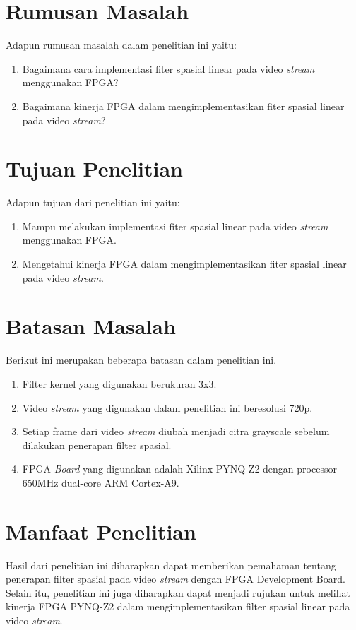 \pagebreak

\section{Rumusan Masalah}
Adapun rumusan masalah dalam penelitian ini yaitu:
\begin{enumerate}[topsep=0pt,itemsep=0pt,partopsep=0pt, parsep=0pt]
    \item Bagaimana cara implementasi fiter spasial linear pada video \textit{stream} menggunakan FPGA? 
    \item Bagaimana kinerja FPGA dalam mengimplementasikan fiter spasial linear pada video \textit{stream}? 
\end{enumerate}

\section{Tujuan Penelitian}
Adapun tujuan dari penelitian ini yaitu:
\begin{enumerate}[topsep=0pt,itemsep=0pt,partopsep=0pt, parsep=0pt]
    \item Mampu melakukan implementasi fiter spasial linear pada video \textit{stream} menggunakan FPGA.
    \item Mengetahui kinerja FPGA dalam mengimplementasikan fiter spasial linear pada video \textit{stream}.
\end{enumerate}


\section{Batasan Masalah}
Berikut ini merupakan beberapa batasan dalam penelitian ini.
\begin{enumerate}[topsep=0pt,itemsep=0pt,partopsep=0pt, parsep=0pt]
    \item Filter kernel yang digunakan berukuran 3x3.
    \item Video \textit{stream} yang digunakan dalam penelitian ini beresolusi 720p.
    \item Setiap frame dari video \textit{stream} diubah menjadi citra grayscale sebelum dilakukan penerapan filter spasial.
    \item FPGA \textit{Board} yang digunakan adalah Xilinx PYNQ-Z2 dengan processor 650MHz dual-core ARM Cortex-A9.
\end{enumerate}

\section{Manfaat Penelitian}
Hasil dari penelitian ini diharapkan dapat memberikan pemahaman tentang penerapan filter spasial pada video \textit{stream} dengan FPGA Development Board. Selain itu, penelitian ini juga diharapkan dapat menjadi rujukan untuk melihat kinerja FPGA PYNQ-Z2 dalam mengimplementasikan filter spasial linear pada video \textit{stream}.
